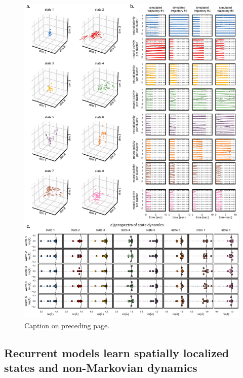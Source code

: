 \documentclass[11pt]{article}
\begin{document}
\begin{figure}[h!]
  \centering
  \vspace{-.5in}
  \includegraphics[width=6in]{figures/v3/figure5B}
  \caption{Caption on preceding page.}
  \label{fig:dynamics}
\end{figure}

\clearpage

\subsection*{Recurrent models learn spatially localized states and non-Markovian dynamics}
\end{document}
